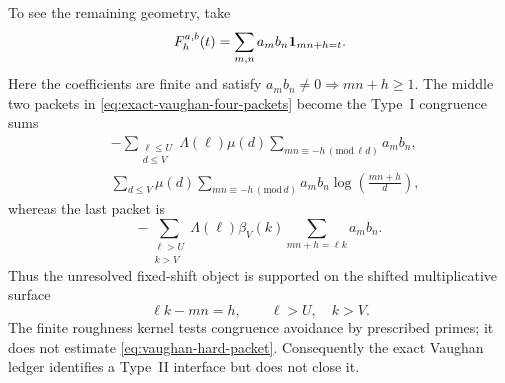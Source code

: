 To see the remaining geometry, take
\begin{equation}\label{eq:vaughan-factor-incidence}
 F_h^{a,b}(t)=\sum_{m,n}a_mb_n\mathbf 1_{mn+h=t}.
\end{equation}
Here the coefficients are finite and satisfy
$a_mb_n\ne0\Rightarrow mn+h\geq1$.
The middle two packets in \eqref{eq:exact-vaughan-four-packets} become the
Type~I congruence sums
\begin{align}
 &-\sum_{\substack{\ell\leq U\\d\leq V}}
  \Lambda(\ell)\mu(d)
  \sum_{mn\equiv-h\, (\mathrm{mod}\,\ell d)}a_mb_n,
 \label{eq:vaughan-type-I-first}\\
 &\sum_{d\leq V}\mu(d)
  \sum_{mn\equiv-h\, (\mathrm{mod}\,d)}
  a_mb_n\log\left(\frac{mn+h}{d}\right),
 \label{eq:vaughan-type-I-second}
\end{align}
whereas the last packet is
\begin{equation}\label{eq:vaughan-hard-packet}
 -\sum_{\substack{\ell>U\\k>V}}
  \Lambda(\ell)\beta_V(k)
  \sum_{mn+h=\ell k}a_mb_n.
\end{equation}
Thus the unresolved fixed-shift object is supported on the shifted
multiplicative surface
\begin{equation}\label{eq:vaughan-shifted-surface}
 \ell k-mn=h,
 \qquad \ell>U,\quad k>V.
\end{equation}
The finite roughness kernel tests congruence avoidance by prescribed primes;
it does not estimate \eqref{eq:vaughan-hard-packet}.  Consequently the exact
Vaughan ledger identifies a Type~II interface but does not close it.
